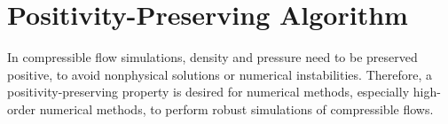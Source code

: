 
\section{Positivity-Preserving Algorithm}
\label{sec:PP}

In compressible flow simulations, density and pressure need to be preserved positive, to avoid nonphysical solutions or numerical instabilities. Therefore, a positivity-preserving property is desired for numerical methods, especially high-order numerical methods, to perform robust simulations of compressible flows.

